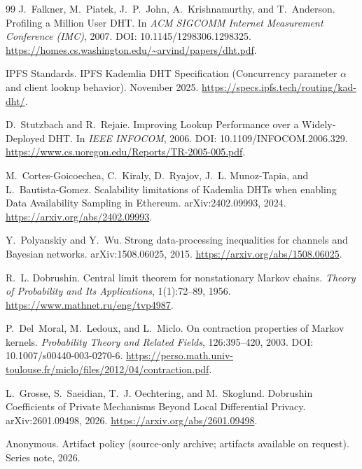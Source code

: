 \documentclass[11pt]{article}
\theoremstyle{definition}
\theoremstyle{remark}
\begin{document}
\begin{thebibliography}{99}
J.~Falkner, M.~Piatek, J.~P.~John, A.~Krishnamurthy, and T.~Anderson.
\newblock Profiling a Million User DHT.
\newblock In \emph{ACM SIGCOMM Internet Measurement Conference (IMC)}, 2007.
\newblock DOI: 10.1145/1298306.1298325.
\newblock \url{https://homes.cs.washington.edu/~arvind/papers/dht.pdf}.

IPFS Standards.
\newblock IPFS Kademlia DHT Specification (Concurrency parameter \(\alpha\) and client lookup behavior).
 November 2025.
\newblock \url{https://specs.ipfs.tech/routing/kad-dht/}.

D.~Stutzbach and R.~Rejaie.
\newblock Improving Lookup Performance over a Widely-Deployed DHT.
\newblock In \emph{IEEE INFOCOM}, 2006.
\newblock DOI: 10.1109/INFOCOM.2006.329.
\newblock \url{https://www.cs.uoregon.edu/Reports/TR-2005-005.pdf}.

M.~Cortes-Goicoechea, C.~Kiraly, D.~Ryajov, J.~L. Munoz-Tapia, and L.~Bautista-Gomez.
\newblock Scalability limitations of Kademlia DHTs when enabling Data Availability Sampling in Ethereum.
\newblock arXiv:2402.09993, 2024.
\newblock \url{https://arxiv.org/abs/2402.09993}.

Y.~Polyanskiy and Y.~Wu.
\newblock Strong data-processing inequalities for channels and Bayesian networks.
\newblock arXiv:1508.06025, 2015.
\newblock \url{https://arxiv.org/abs/1508.06025}.

R.~L. Dobrushin.
\newblock Central limit theorem for nonstationary Markov chains.
\newblock \emph{Theory of Probability and Its Applications}, 1(1):72--89, 1956.
\newblock \url{https://www.mathnet.ru/eng/tvp4987}.

P.~Del~Moral, M.~Ledoux, and L.~Miclo.
\newblock On contraction properties of Markov kernels.
\newblock \emph{Probability Theory and Related Fields}, 126:395--420, 2003.
\newblock DOI: 10.1007/s00440-003-0270-6. \url{https://perso.math.univ-toulouse.fr/miclo/files/2012/04/contraction.pdf}.

L.~Grosse, S.~Saeidian, T.~J. Oechtering, and M.~Skoglund.
\newblock Dobrushin Coefficients of Private Mechanisms Beyond Local Differential Privacy.
\newblock arXiv:2601.09498, 2026.
\newblock \url{https://arxiv.org/abs/2601.09498}.


Anonymous.
\newblock Artifact policy (source-only archive; artifacts available on request).
\newblock Series note, 2026.



\end{thebibliography}
\end{document}
